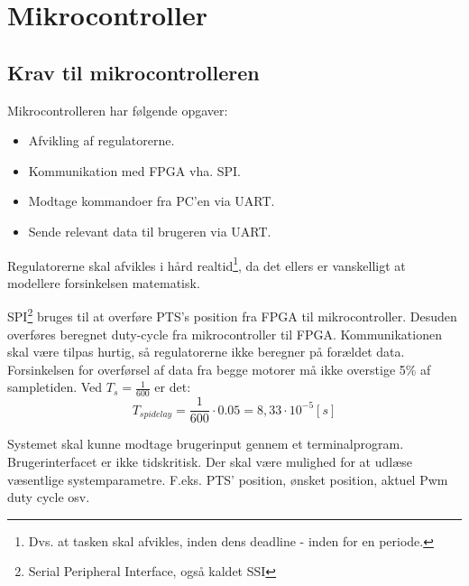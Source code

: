 \section{Mikrocontroller}
\label{sec:mikrocontroller}
%
\subsection{Krav til mikrocontrolleren}
Mikrocontrolleren har følgende opgaver: 


\begin{itemize}
\itemsep1pt
	\item Afvikling af regulatorerne.
	\item Kommunikation med FPGA vha. SPI.
	\item Modtage kommandoer fra PC'en via UART.
	\item Sende relevant data til brugeren via UART.
\end{itemize}

Regulatorerne skal afvikles i hård realtid\footnote{Dvs. at tasken skal afvikles, inden dens deadline - inden for en periode.}, da det ellers er vanskelligt at modellere forsinkelsen matematisk.


SPI\footnote{Serial Peripheral Interface, også kaldet SSI} bruges til at overføre PTS's position fra FPGA til mikrocontroller. Desuden overføres beregnet duty-cycle fra mikrocontroller til FPGA. Kommunikationen skal være tilpas hurtig, så regulatorerne ikke beregner på forældet data. Forsinkelsen for overførsel af data fra begge motorer må ikke overstige 5\% af sampletiden. Ved $T_s = \frac{1}{600}$ er det: 
\begin{equation}
	T_{spi delay} = \frac{1}{600} \cdot 0.05 = 8,33 \cdot 10^{-5}[s]
\end{equation}


Systemet skal kunne modtage brugerinput gennem et terminalprogram. Brugerinterfacet er ikke tidskritisk. Der skal være mulighed for at udlæse væsentlige systemparametre. F.eks. PTS' position, ønsket position, aktuel Pwm duty cycle osv.


